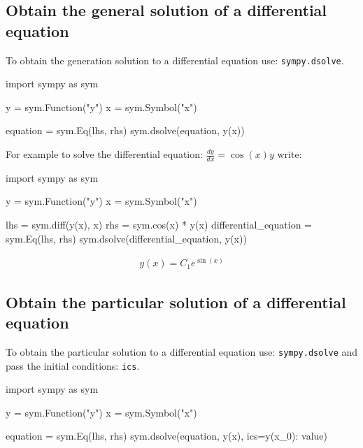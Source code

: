 \subsection{Obtain the general solution of a differential equation}
\label{\detokenize{tools-for-mathematics/09-differential-equations/how/main:how-to-obtain-the-general-solution-of-a-differential-equation}}

To obtain the generation solution to a differential equation use:
\texttt{sympy.dsolve}.


\begin{api}
import sympy as sym

y = sym.Function("y")
x = sym.Symbol("x")

equation = sym.Eq(lhs, rhs)
sym.dsolve(equation, y(x))
\end{api}



For example to solve the differential equation: \(\frac{dy}{dx} = \cos(x) y\) 
write:


\begin{pyin}
import sympy as sym

y = sym.Function("y")
x = sym.Symbol("x")

lhs = sym.diff(y(x), x)
rhs = sym.cos(x) * y(x)
differential_equation = sym.Eq(lhs, rhs)
sym.dsolve(differential_equation, y(x))
\end{pyin}




\begin{equation*}
\begin{split}\displaystyle y{\left(x \right)} = C_{1} e^{\sin{\left(x \right)}}\end{split}
\end{equation*}




\subsection{Obtain the particular solution of a differential equation}
\label{\detokenize{tools-for-mathematics/09-differential-equations/how/main:how-to-obtain-the-particular-solution-of-a-differential-equation}}

To obtain the particular solution to a differential equation use:
\texttt{sympy.dsolve} and pass the initial conditions: \texttt{ics}.


\begin{api}
import sympy as sym

y = sym.Function("y")
x = sym.Symbol("x")

equation = sym.Eq(lhs, rhs)
sym.dsolve(equation, y(x), ics={y(x_0): value})
\end{api}




